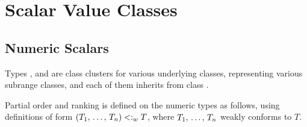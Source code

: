 \section{Scalar Value Classes}
\label{sec:scalar-value-classes}






\subsection{Numeric Scalars}

Types ,  and  are class clusters for various underlying classes, representing various subrange classes, and each of them inherits from class . 

Partial order and ranking is defined on the numeric types as follows, using definitions of form $(T_1 ,\, \ldots ,\, T_n) <:_w T$, where $T_1 ,\, \ldots ,\, T_n$ weakly conforms to $T$. 
